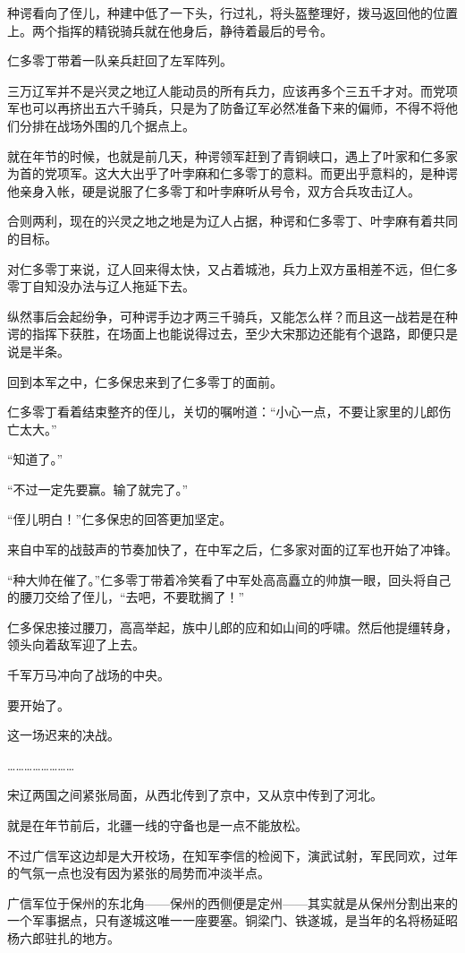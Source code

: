 种谔看向了侄儿，种建中低了一下头，行过礼，将头盔整理好，拨马返回他的位置上。两个指挥的精锐骑兵就在他身后，静待着最后的号令。

仁多零丁带着一队亲兵赶回了左军阵列。

三万辽军并不是兴灵之地辽人能动员的所有兵力，应该再多个三五千才对。而党项军也可以再挤出五六千骑兵，只是为了防备辽军必然准备下来的偏师，不得不将他们分排在战场外围的几个据点上。

就在年节的时候，也就是前几天，种谔领军赶到了青铜峡口，遇上了叶家和仁多家为首的党项军。这大大出乎了叶孛麻和仁多零丁的意料。而更出乎意料的，是种谔他亲身入帐，硬是说服了仁多零丁和叶孛麻听从号令，双方合兵攻击辽人。

合则两利，现在的兴灵之地之地是为辽人占据，种谔和仁多零丁、叶孛麻有着共同的目标。

对仁多零丁来说，辽人回来得太快，又占着城池，兵力上双方虽相差不远，但仁多零丁自知没办法与辽人拖延下去。

纵然事后会起纷争，可种谔手边才两三千骑兵，又能怎么样？而且这一战若是在种谔的指挥下获胜，在场面上也能说得过去，至少大宋那边还能有个退路，即便只是说是半条。

回到本军之中，仁多保忠来到了仁多零丁的面前。

仁多零丁看着结束整齐的侄儿，关切的嘱咐道：“小心一点，不要让家里的儿郎伤亡太大。”

“知道了。”

“不过一定先要赢。输了就完了。”

“侄儿明白！”仁多保忠的回答更加坚定。

来自中军的战鼓声的节奏加快了，在中军之后，仁多家对面的辽军也开始了冲锋。

“种大帅在催了。”仁多零丁带着冷笑看了中军处高高矗立的帅旗一眼，回头将自己的腰刀交给了侄儿，“去吧，不要耽搁了！”

仁多保忠接过腰刀，高高举起，族中儿郎的应和如山间的呼啸。然后他提缰转身，领头向着敌军迎了上去。

千军万马冲向了战场的中央。

要开始了。

这一场迟来的决战。

……………………

宋辽两国之间紧张局面，从西北传到了京中，又从京中传到了河北。

就是在年节前后，北疆一线的守备也是一点不能放松。

不过广信军这边却是大开校场，在知军李信的检阅下，演武试射，军民同欢，过年的气氛一点也没有因为紧张的局势而冲淡半点。

广信军位于保州的东北角——保州的西侧便是定州——其实就是从保州分割出来的一个军事据点，只有遂城这唯一一座要塞。铜梁门、铁遂城，是当年的名将杨延昭杨六郎驻扎的地方。


